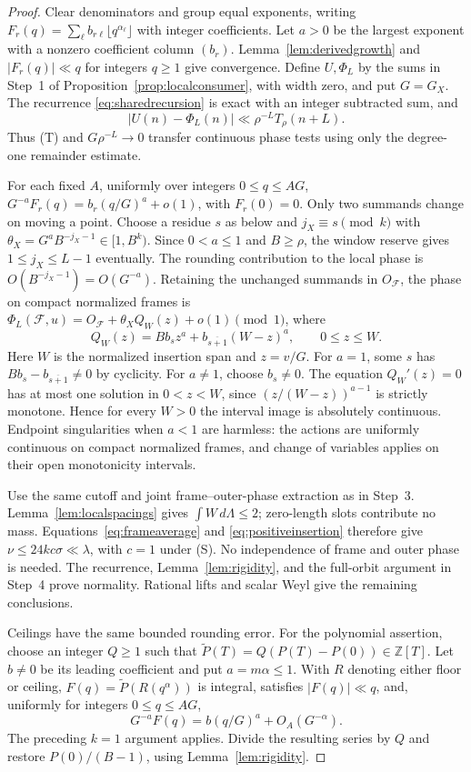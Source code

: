 \documentclass[11pt,a4paper]{article}
\begin{document}
\begin{proof}
Clear denominators and group equal exponents, writing
$F_r(q)=\sum_\ell b_{r\ell}\lfloor q^{\alpha_\ell}\rfloor$
with integer coefficients. Let $a>0$ be the largest exponent with a
nonzero coefficient column $(b_r)$. Lemma~\ref{lem:derivedgrowth}
and $|F_r(q)|\ll q$ for integers $q\ge1$ give convergence.
Define $U,\Phi_L$ by the sums in Step~1 of
Proposition~\ref{prop:localconsumer}, with width zero, and put $G=G_X$.
The recurrence \eqref{eq:sharedrecursion} is exact with an integer
subtracted sum, and
\[
 |U(n)-\Phi_L(n)|\ll\rho^{-L}T_\rho(n+L).
\]
Thus (T) and $G\rho^{-L}\to0$ transfer continuous phase tests
using only the degree-one remainder estimate.

For each fixed $A$, uniformly over integers $0\le q\le AG$,
$G^{-a}F_r(q)=b_r(q/G)^a+o(1)$, with $F_r(0)=0$.
Only two summands change on moving a point. Choose a residue $s$ as
below and $j_X\equiv s\pmod k$ with
$\theta_X=G^aB^{-j_X-1}\in[1,B^k)$.
Since $0<a\le1$ and $B\ge\rho$, the window reserve gives
$1\le j_X\le L-1$ eventually. The rounding contribution to the local
phase is $O(B^{-j_X-1})=O(G^{-a})$.
Retaining the unchanged summands in
$O_{\mathcal F}$, the phase on compact normalized frames is
$\Phi_L(\mathcal F,u)=O_{\mathcal F}+\theta_XQ_W(z)+o(1)\pmod1$, where
\[
 Q_W(z)=Bb_s z^a+b_{\overline{s+1}}(W-z)^a,\qquad
 0\le z\le W.
\]
Here $W$ is the normalized insertion span and $z=v/G$.
For $a=1$, some $s$ has $Bb_s-b_{\overline{s+1}}\ne0$ by cyclicity.
For $a\ne1$, choose $b_s\ne0$. The equation $Q_W'(z)=0$ has at most
one solution in $0<z<W$, since $(z/(W-z))^{a-1}$ is strictly
monotone. Hence for every $W>0$ the interval image is absolutely
continuous. Endpoint singularities when $a<1$ are harmless:
the actions are uniformly continuous on compact normalized frames,
and change of variables applies on their open monotonicity intervals.

Use the same cutoff and joint frame--outer-phase extraction as in
Step~3. Lemma~\ref{lem:localspacings} gives $\int W\,d\Lambda\le2$;
zero-length slots contribute no mass.
Equations~\eqref{eq:frameaverage} and \eqref{eq:positiveinsertion}
therefore give $\nu\le24kc\sigma\ll\lambda$, with $c=1$ under (S).
No independence of frame and outer phase is needed.
The recurrence, Lemma~\ref{lem:rigidity}, and the full-orbit argument
in Step~4 prove normality. Rational lifts and scalar Weyl give the
remaining conclusions.

Ceilings have the same bounded rounding error. For the polynomial
assertion, choose an integer $Q\ge1$ such that
$\widetilde P(T)=Q(P(T)-P(0))\in\mathbb Z[T]$.
Let $b\ne0$ be its leading coefficient and put $a=m\alpha\le1$.
With $R$ denoting either floor or ceiling,
$F(q)=\widetilde P(R(q^\alpha))$ is integral, satisfies $|F(q)|\ll q$,
and, uniformly for integers $0\le q\le AG$,
\[
 G^{-a}F(q)=b(q/G)^a+O_A(G^{-\alpha}).
\]
The preceding $k=1$ argument applies. Divide the resulting series by
$Q$ and restore $P(0)/(B-1)$, using Lemma~\ref{lem:rigidity}.
\end{proof}
\end{document}
